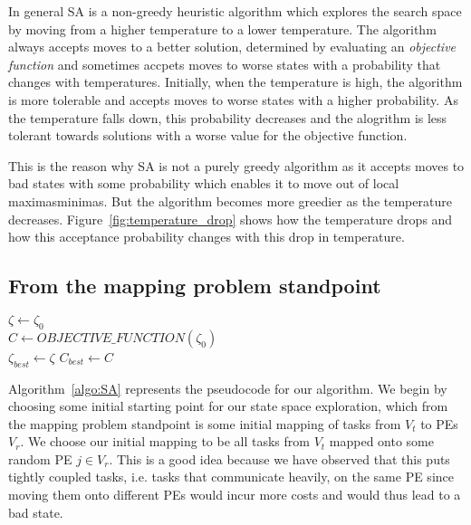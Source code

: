 In general SA is a non-greedy heuristic algorithm which explores the search
space by moving from a higher temperature to a lower temperature. The algorithm
always accepts moves to a better solution, determined by evaluating an
\textit{objective function} and sometimes accpets moves to worse states with a
probability that changes with temperatures. Initially, when the temperature is
high, the algorithm is more tolerable and accepts moves to worse states with a
higher probability. As the temperature falls down, this probability decreases
and the alogrithm is less tolerant towards solutions with a worse value for the
objective function.

This is the reason why SA is not a purely greedy algorithm as it accepts moves
to bad states with some probability which enables it to move out of local
maximas\/minimas. But the algorithm becomes more greedier as the temperature
decreases. Figure~\ref{fig:temperature_drop} shows how the temperature drops and
how this acceptance probability changes with this drop in temperature.

\subsection{From the mapping problem standpoint}

\begin{algorithm}[1]
\caption{$Simulated\_Annealing(\zeta_0, \mathcal{T}_0)$}
\label{algo:SA}
\DontPrintSemicolon
{}
$\zeta \leftarrow \zeta_0$ \\
$C \leftarrow OBJECTIVE\_FUNCTION(\zeta_0)$ \\
$\zeta_{best} \leftarrow \zeta$
$C_{best} \leftarrow C$
\end{algorithm}

Algorithm~\ref{algo:SA} represents the pseudocode for our algorithm. We begin by
choosing some initial starting point for our state space exploration, which from
the mapping problem standpoint is some initial mapping of tasks from $V_t$ to
PEs $V_r$. We choose our initial mapping to be all tasks from $V_t$ mapped onto
some random PE $j \in V_r$. This is a good idea because we have observed that
this puts tightly coupled tasks, i.e. tasks that communicate heavily, on the
same PE since moving them onto different PEs would incur more costs and would thus
lead to a bad state.

